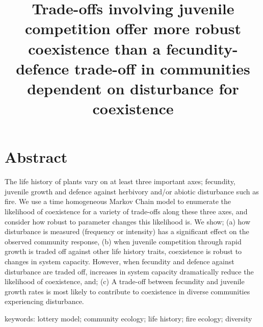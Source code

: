 \documentclass[a4paper]{article}
\begin{document}
\title{Trade-offs involving juvenile competition offer more robust coexistence than a fecundity-defence trade-off in communities dependent on disturbance for coexistence}
\maketitle

\section*{Abstract}
The life history of plants vary on at least three important axes; fecundity, juvenile growth and defence against herbivory and/or abiotic disturbance such as fire. We use a time homogeneous Markov Chain model to enumerate the likelihood of coexistence for a variety of trade-offs along these three axes, and consider how robust to parameter changes this likelihood is. We show; (a) how disturbance is measured (frequency or intensity) has a significant effect on the observed community response, (b) when juvenile competition through rapid growth is traded off against other life history traits, coexistence is robust to changes in system capacity. However, when fecundity and defence against disturbance are traded off, increases in system capacity dramatically reduce the likelihood of coexistence, and; (c) A trade-off between fecundity and juvenile growth rates is most likely to contribute to coexistence in diverse communities experiencing disturbance.

\vspace{.5cm}
keywords: lottery model; community ecology; life history; fire ecology; diversity
\end{document}
